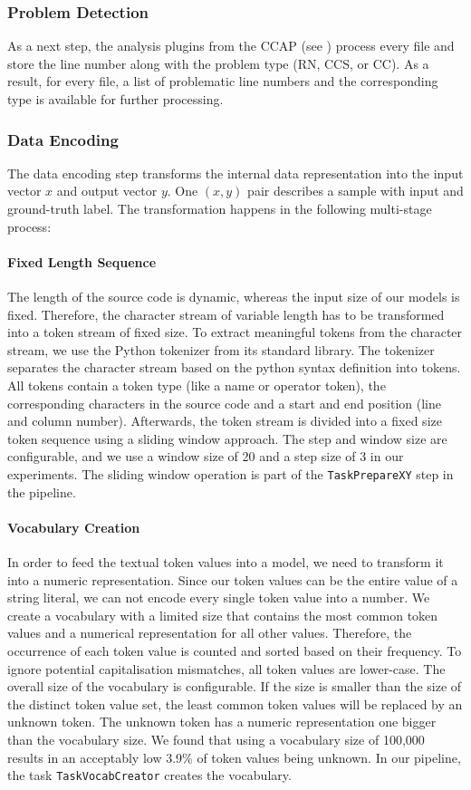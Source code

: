 \subsubsection{Problem Detection}\label{sec:problem_detection}
As a next step, the analysis plugins from the CCAP (see ) process every file and store the line number along with the problem type (RN, CCS, or CC). As a result, for every file, a list of problematic line numbers and the corresponding type is available for further processing. 

\subsubsection{Data Encoding}\label{sec:data_encoding}
The data encoding step transforms the internal data representation into the input vector $x$ and output vector $y$. One $(x,y)$ pair describes a sample with input and ground-truth label. The transformation happens in the following multi-stage process:
\paragraph{Fixed Length Sequence}
The length of the source code is dynamic, whereas the input size of our models is fixed. Therefore, the character stream of variable length has to be transformed into a token stream of fixed size. 
To extract meaningful tokens from the character stream, we use the Python tokenizer from its standard library. The tokenizer separates the character stream based on the python syntax definition into tokens. All tokens contain a token type (like a name or operator token), the corresponding characters in the source code and a start and end position (line and column number). Afterwards, the token stream is divided into a fixed size token sequence using a sliding window approach. The step and window size are configurable, and we use a window size of 20 and a step size of 3 in our experiments. The sliding window operation is part of the \texttt{TaskPrepareXY} step in the pipeline.
\paragraph{Vocabulary Creation}
In order to feed the textual token values into a model, we need to transform it into a numeric representation. Since our token values can be the entire value of a string literal, we can not encode every single token value into a number. We create a vocabulary with a limited size that contains the most common token values and a numerical representation for all other values.
Therefore, the occurrence of each token value is counted and sorted based on their frequency. To ignore potential capitalisation mismatches, all token values are lower-case. The overall size of the vocabulary is configurable. If the size is smaller than the size of the distinct token value set, the least common token values will be replaced by an unknown token. The unknown token has a numeric representation one bigger than the vocabulary size. We found that using a vocabulary size of 100,000 results in an acceptably low 3.9\% of token values being unknown. In our pipeline, the task \texttt{TaskVocabCreator} creates the vocabulary.
